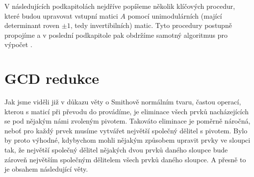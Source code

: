 V následujících podkapitolách nejdříve popíšeme několik klíčových procedur, které
budou upravovat vstupní matici $ A $ pomocí unimodulárních (mající determinant
roven $\pm 1$, tedy invertibilních) matic.
Tyto procedury postupně propojíme a v poslední podkapitole pak obdržíme samotný
algoritmus pro výpočet \rst.





\section{GCD redukce}
Jak jsme viděli již v důkazu věty o Smithově normálním tvaru, častou operací,
kterou s maticí při převodu do \snf provádíme, je eliminace všech prvků
nacházejících se pod nějakým námi zvoleným pivotem. Takováto eliminace je poměrně
náročná, neboť pro každý prvek musíme vytvářet největší společný dělitel s pivotem.
Bylo by proto výhodné, kdybychom mohli nějakým způsobem upravit prvky ve sloupci tak,
že největší společný dělitel nějakých dvou prvků daného sloupce bude zároveň největším
společným dělitelem všech prvků daného sloupce. A přesně to je obsahem následující věty.

